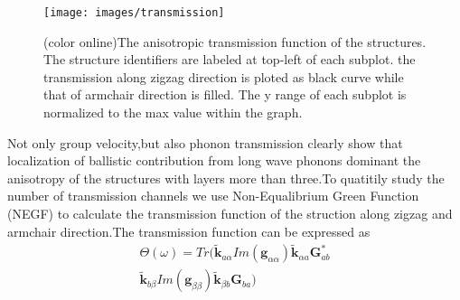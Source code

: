 \documentclass[%
 reprint,
 amsmath,amssymb,
 aps,
 prb,
]{revtex4-1}
\begin{document}
\begin{figure}[b]
  \texttt{[image: images/transmission]}
  \caption{\label{fig:transmission} (color online)The anisotropic transmission function of the structures. The structure identifiers are labeled at top-left of each subplot. the transmission along zigzag direction is ploted as black curve while that of armchair direction is filled. The y range of each subplot is normalized to the max value within the graph.}
\end{figure}

Not only group velocity,but also phonon transmission clearly show that  localization of ballistic contribution from long wave phonons dominant the anisotropy of the structures with layers more than three.To quatitily study the number of transmission channels we use Non-Equalibrium Green Function (NEGF)\cite{Mingo2003} to calculate the transmission function of the struction along zigzag and armchair direction.The transmission function can be expressed as
\begin{equation}
  \begin{split}
    \Theta(\omega)= Tr(
    \mathbf{\widetilde{k}}_{a\alpha}
    Im(\mathbf{g}_{\alpha\alpha})
    \mathbf{\widetilde{k}}_{\alpha a}
    \mathbf{G}_{a b}^*\\
    \mathbf{\widetilde{k}}_{b\beta}
    Im(\mathbf{g}_{\beta\beta})
    \mathbf{\widetilde{k}}_{\beta b}
    \mathbf{G}_{b a}
    )
  \end{split}
\end{equation}
\end{document}
